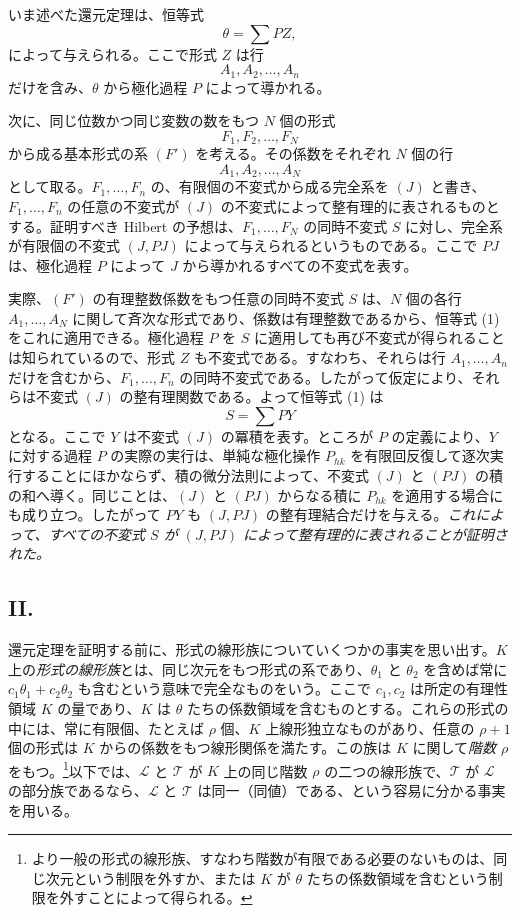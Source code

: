 \documentclass[11pt]{article}
\begin{document}
いま述べた還元定理は、恒等式
\begin{equation}
  \theta=\sum PZ,
\tag{1}
\end{equation}
によって与えられる。ここで形式 $Z$ は行
\[
  A_1,A_2,\ldots,A_n
\]
だけを含み、$\theta$ から極化過程 $P$ によって導かれる。

次に、同じ位数かつ同じ変数の数をもつ $N$ 個の形式
\[
  F_1,F_2,\ldots,F_N
\]
から成る基本形式の系 $(F')$ を考える。その係数をそれぞれ $N$ 個の行
\[
  A_1,A_2,\ldots,A_N
\]
として取る。$F_1,
\ldots,F_n$ の、有限個の不変式から成る完全系を $(J)$ と書き、$F_1,
\ldots,F_n$ の任意の不変式が $(J)$ の不変式によって整有理的に表されるものとする。証明すべき Hilbert の予想は、$F_1,
\ldots,F_N$ の同時不変式 $S$ に対し、完全系が有限個の不変式 $(J,PJ)$ によって与えられるというものである。ここで $PJ$ は、極化過程 $P$ によって $J$ から導かれるすべての不変式を表す。

実際、$(F')$ の有理整数係数をもつ任意の同時不変式 $S$ は、$N$ 個の各行 $A_1,
\ldots,A_N$ に関して斉次な形式であり、係数は有理整数であるから、恒等式 (1) をこれに適用できる。極化過程 $P$ を $S$ に適用しても再び不変式が得られることは知られているので、形式 $Z$ も不変式である。すなわち、それらは行 $A_1,
\ldots,A_n$ だけを含むから、$F_1,
\ldots,F_n$ の同時不変式である。したがって仮定により、それらは不変式 $(J)$ の整有理関数である。よって恒等式 (1) は
\[
  S=\sum PY
\]
となる。ここで $Y$ は不変式 $(J)$ の冪積を表す。ところが $P$ の定義により、$Y$ に対する過程 $P$ の実際の実行は、単純な極化操作 $P_{hk}$ を有限回反復して逐次実行することにほかならず、積の微分法則によって、不変式 $(J)$ と $(PJ)$ の積の和へ導く。同じことは、$(J)$ と $(PJ)$ からなる積に $P_{hk}$ を適用する場合にも成り立つ。したがって $PY$ も $(J,PJ)$ の整有理結合だけを与える。\emph{これによって、すべての不変式 $S$ が $(J,PJ)$ によって整有理的に表されることが証明された。}

\subsection*{II.}
還元定理を証明する前に、形式の線形族についていくつかの事実を思い出す。$K$ 上の\emph{形式の線形族}とは、同じ次元をもつ形式の系であり、$\theta_1$ と $\theta_2$ を含めば常に $c_1\theta_1+c_2\theta_2$ も含むという意味で完全なものをいう。ここで $c_1,c_2$ は所定の有理性領域 $K$ の量であり、$K$ は $\theta$ たちの係数領域を含むものとする。これらの形式の中には、常に有限個、たとえば $\rho$ 個、$K$ 上線形独立なものがあり、任意の $\rho+1$ 個の形式は $K$ からの係数をもつ線形関係を満たす。この族は $K$ に関して\emph{階数 $\rho$} をもつ。\footnote{より一般の形式の線形族、すなわち階数が有限である必要のないものは、同じ次元という制限を外すか、または $K$ が $\theta$ たちの係数領域を含むという制限を外すことによって得られる。}以下では、$\mathcal L$ と $\mathcal T$ が $K$ 上の同じ階数 $\rho$ の二つの線形族で、$\mathcal T$ が $\mathcal L$ の部分族であるなら、$\mathcal L$ と $\mathcal T$ は同一（同値）である、という容易に分かる事実を用いる。
\end{document}
